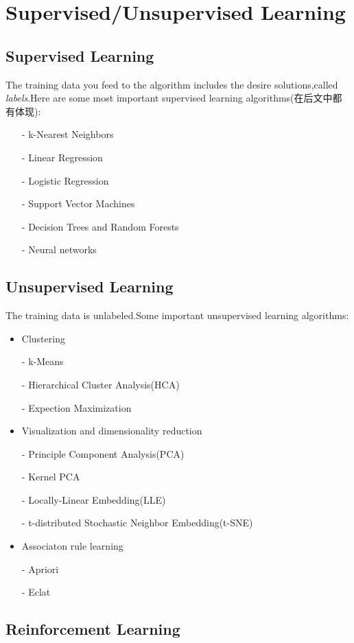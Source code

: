 \documentclass[UTF8]{ctexart}
\begin{document}
\section{Supervised/Unsupervised Learning}
\subsection{Supervised Learning}

The training data you feed to the algorithm includes the desire solutions,called \emph{labels}.Here are some most important supervised learning algorithms(在后文中都有体现):

\begin{itemize}
	\item[-] k-Nearest Neighbors
	\item[-] Linear Regression
	\item[-] Logistic Regression
	\item[-] Support Vector Machines
	\item[-] Decision Trees and Random Forests
	\item[-] Neural networks
\end{itemize}

\subsection{Unsupervised Learning}

The training data is unlabeled.Some important unsupervised learning algorithms:
\begin{itemize}
	\item Clustering
	\item[-] k-Means
	\item[-] Hierarchical Cluster Analysis(HCA)
	\item[-] Expection Maximization
	\item Visualization and dimensionality reduction
	\item[-] Principle Component Analysis(PCA)
	\item[-] Kernel PCA
	\item[-] Locally-Linear Embedding(LLE)
	\item[-] t-distributed Stochastic Neighbor Embedding(t-SNE)
	\item Associaton rule learning
	\item[-] Apriori
	\item[-] Eclat
\end{itemize}

\subsection{Reinforcement Learning}
\end{document}
